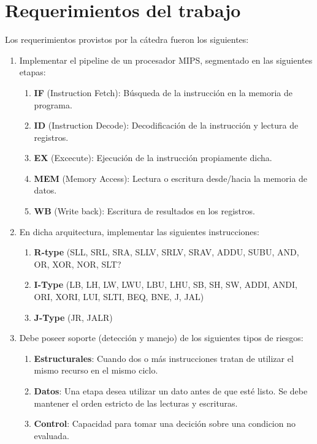 \documentclass[12pt]{article}
\begin{document}
\section{Requerimientos del trabajo}\label{sec:consigna}

Los requerimientos provistos por la cátedra fueron los siguientes:

\begin{enumerate}
  \item Implementar el pipeline de un procesador MIPS, segmentado en las siguientes etapas:
  \begin{enumerate}
    \item \textbf{IF} (Instruction Fetch): Búsqueda de la instrucción en la memoria de programa.
    \item \textbf{ID} (Instruction Decode): Decodificación de la instrucción y lectura de registros.
    \item \textbf{EX} (Excecute): Ejecución de la instrucción propiamente dicha.
    \item \textbf{MEM} (Memory Access): Lectura o escritura desde/hacia la memoria de datos.
    \item \textbf{WB} (Write back): Escritura de resultados en los registros.
  \end{enumerate}
  \item En dicha arquitectura, implementar las siguientes instrucciones:
  \begin{enumerate}
    \item \textbf{R-type} (SLL, SRL, SRA, SLLV, SRLV, SRAV, ADDU, SUBU, AND, OR, XOR, NOR, SLT?
    \item \textbf{I-Type} (LB, LH, LW, LWU, LBU, LHU, SB, SH, SW, ADDI, ANDI, ORI, XORI, LUI, SLTI, BEQ, BNE, J, JAL)
    \item \textbf{J-Type} (JR, JALR)
  \end{enumerate}
  \item Debe poseer soporte (detección y manejo) de los siguientes tipos de riesgos:
  \begin{enumerate}
    \item \textbf{Estructurales}: Cuando dos o más instrucciones tratan de utilizar el mismo recurso en el mismo ciclo.
    \item \textbf{Datos}: Una etapa desea utilizar un dato antes de que esté listo. Se debe mantener el orden estricto de las lecturas y escrituras.
    \item \textbf{Control}: Capacidad para tomar una decición sobre una condicion no evaluada. \\

\end{enumerate}
\end{enumerate}
\end{document}
